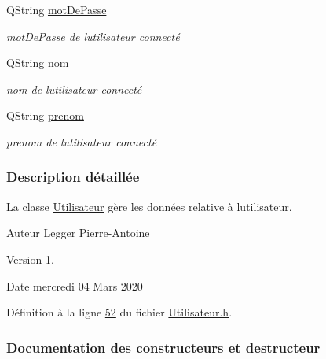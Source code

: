\begin{DoxyCompactItemize}
Q\+String \hyperlink{class_utilisateur_a4f6a17d0fb5c231bcb414396236a056f}{mot\+De\+Passe}
\begin{DoxyCompactList}\small\item\em mot\+De\+Passe de l\textquotesingle{}utilisateur connecté \end{DoxyCompactList}\item 
Q\+String \hyperlink{class_utilisateur_a1096e809aca4b7cf453a7af93cb72502}{nom}
\begin{DoxyCompactList}\small\item\em nom de l\textquotesingle{}utilisateur connecté \end{DoxyCompactList}\item 
Q\+String \hyperlink{class_utilisateur_a1dd0779807b19298f30f39d9c371170f}{prenom}
\begin{DoxyCompactList}\small\item\em prenom de l\textquotesingle{}utilisateur connecté \end{DoxyCompactList}\end{DoxyCompactItemize}


\subsubsection{Description détaillée}
La classe \hyperlink{class_utilisateur}{Utilisateur} gère les données relative à l\textquotesingle{}utilisateur. 

\begin{DoxyAuthor}{Auteur}
Legger Pierre-\/\+Antoine
\end{DoxyAuthor}
\begin{DoxyVersion}{Version}
1.
\end{DoxyVersion}
\begin{DoxyDate}{Date}
mercredi 04 Mars 2020 
\end{DoxyDate}


Définition à la ligne \hyperlink{_utilisateur_8h_source_l00052}{52} du fichier \hyperlink{_utilisateur_8h_source}{Utilisateur.\+h}.



\subsubsection{Documentation des constructeurs et destructeur}
\mbox{\label{class_utilisateur_a89e539739c5f6c6790909ac5fc5729b8}} 
